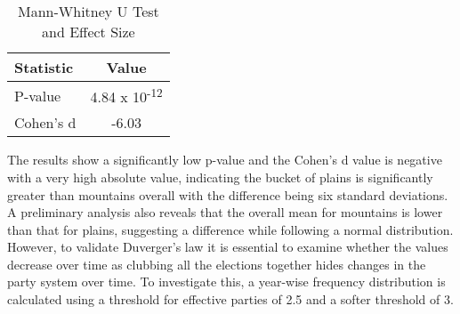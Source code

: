 \begin{table}[h]
\centering
\begin{tabular}{|l|c|}
\hline
Statistic & Value \\
\hline
P-value & 4.84 x 10\textsuperscript{-12} \\
Cohen's d & -6.03 \\
\hline
\end{tabular}
\label{tab:stats_tests}
\caption{Mann-Whitney U Test and Effect Size}

\end{table}


\vspace{0.3cm}

The results show a significantly low p-value and the Cohen's d value is negative with a very high absolute value, indicating the bucket of plains is significantly greater than mountains overall with the difference being six standard deviations. 
A preliminary analysis also reveals that the overall mean for mountains is lower than that for plains,  suggesting a difference while following a normal distribution. However, to validate Duverger's law it is essential to examine whether the values decrease over time as clubbing all the elections together hides changes in the party system over time. To investigate this, a year-wise frequency distribution is calculated using a threshold for effective parties of 2.5 and a softer threshold of 3.
